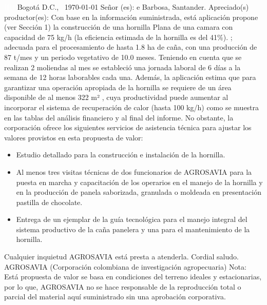 \documentclass{article}%
\begin{document}
\begin{large}%
\textcolor{white}{ 
HH
}%
\linebreak%
Bogotá D.C., %
\ {\today}%
\newline%
 \newline%
%
\linebreak%
\newline%
Señor (es):%
\newline%
e%
\newline%
Barbosa, Santander.%
\newline%
 \newline%
%
\newline%
Apreciado(s) productor(es):%
\newline%
 \newline%
%
Con base en la información suministrada, está aplicación propone (ver Sección 1) la construcción de una hornilla Plana de una camara con capacidad de 75 kg/h (la eficiencia estimada de la hornilla es del 41\%). ; adecuada para el procesamiento de hasta 1.8 ha de caña, con una producción de 87 t/mes y un periodo vegetativo de 10.0 meses. Teniendo en cuenta que se realizan 2 moliendas al mes se estableció una jornada laboral de 6 días a la semana de 12 horas laborables cada una.\newline%
 Además, la aplicación estima que para garantizar una operación apropiada de la hornilla  se requiere de un área disponible de al menos 322 m²%
, cuya productividad puede aumentar al incorporar el sistema de recuperación de calor (hasta 100 kg/h) como se muestra en las tablas del análisis financiero y al final del informe. No obstante, la corporación ofrece los siguientes servicios de asistencia técnica para ajustar los valores provistos en esta propuesta de valor:%
\begin{itemize}%
\item%
Estudio detallado para la construcción e instalación de la hornilla.%
\item%
Al menos tres visitas técnicas de dos funcionarios de AGROSAVIA para la puesta en marcha y capacitación de los operarios en el manejo de la hornilla y en la producción de panela saborizada, granulada o moldeada en presentación pastilla de chocolate.%
\item%
Entrega de un ejemplar de la guía tecnológica para el manejo integral del sistema productivo de la caña panelera y una para el mantenimiento de la hornilla.%
\end{itemize}%
Cualquier inquietud AGROSAVIA está presta a atenderla.\newline%
Cordial saludo.\newline%
\newline%
 \newline%
 \newline%
AGROSAVIA (Corporación colombiana de investigación agropecuaria)%
\newline%
 \newline%
 Nota: Está propuesta de valor se basa en condiciones del terreno ideales y estacionarias, por lo que, AGROSAVIA no se hace responsable de la reproducción total o parcial del material aquí suministrado sin una aprobación corporativa.%
\end{large}%
\end{document}

